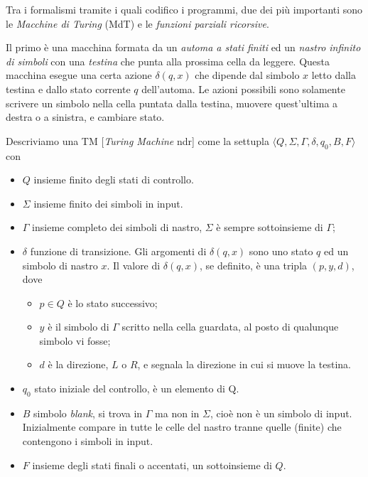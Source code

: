 Tra i formalismi tramite i quali codifico i programmi, due dei più importanti sono le \emph{Macchine di Turing} (MdT) e le \emph{funzioni parziali ricorsive}. 

Il primo è una macchina formata da un \emph{automa a stati finiti} ed un \emph{nastro infinito di simboli} con una \emph{testina} che punta alla prossima cella da leggere. Questa macchina esegue una certa azione $\delta(q,x)$ che dipende dal simbolo $x$ letto dalla testina e dallo stato corrente $q$ dell'automa. Le azioni possibili sono solamente scrivere un simbolo nella cella puntata dalla testina, muovere quest'ultima a destra o a sinistra, e cambiare stato.

\begin{definition}
Descriviamo una TM [\emph{Turing Machine} ndr] come la settupla \(\langle Q, \Sigma, \Gamma, \delta, q_0, B, F \rangle\) con 
\begin{itemize}
    \item $Q$ insieme finito degli stati di controllo.
    \item $\Sigma$ insieme finito dei simboli in input.
    \item $\Gamma$ insieme completo dei simboli di nastro, $\Sigma$ è sempre sottoinsieme di $\Gamma$;
    \item $\delta$ funzione di transizione. Gli argomenti di $\delta(q,x)$ sono uno stato $q$ ed un simbolo di nastro $x$. Il valore di  $\delta(q,x)$, se definito, è una tripla $(p, y, d)$, dove 
    \begin{itemize}
        \item $p \in Q$ è lo stato successivo;
        \item $y$ è il simbolo di $\Gamma$ scritto nella cella guardata, al posto di qualunque simbolo vi fosse;
        \item $d$ è la direzione, $L$ o $R$, e segnala la direzione in cui si muove la testina.
    \end{itemize}
    \item $q_0$ stato iniziale del controllo, è un elemento di Q.
    \item $B$ simbolo \emph{blank}, si trova in $\Gamma$ ma non in $\Sigma$, cioè non è un simbolo di input. Inizialmente compare in tutte le celle del nastro tranne quelle (finite) che contengono i simboli in input.
    \item $F$ insieme degli stati finali o accentati, un sottoinsieme di $Q$.
\end{itemize}    
\end{definition}

